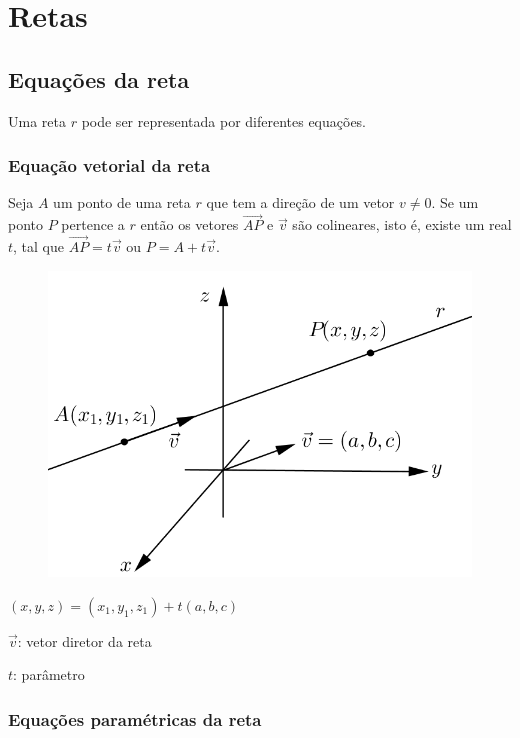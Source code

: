 \chapter{Retas}

\section{Equações da reta}

Uma reta $r$ pode ser representada por diferentes equações.

\subsection{Equação vetorial da reta}

Seja $A$ um ponto de uma reta $r$ que tem a direção de um vetor $v\neq 0$. Se um ponto $P$ pertence a $r$ então os vetores $\overrightarrow{AP}$ e $\vec v$ são colineares, isto é, existe um real $t$, tal que $\overrightarrow{AP}=t\vec v$ ou $P=A+t\vec v$.
\begin{multicols}{2}
\begin{figure}[H]
\centering
\includegraphics[scale=1]{analitica/imagens/reta-vetorial.png}
\end{figure}

$(x, y, z)=(x_1, y_1, z_1)+t(a,b,c)$

$\vec v$: vetor diretor da reta

$t$: parâmetro
\end{multicols}

\subsection{Equações paramétricas da reta}

